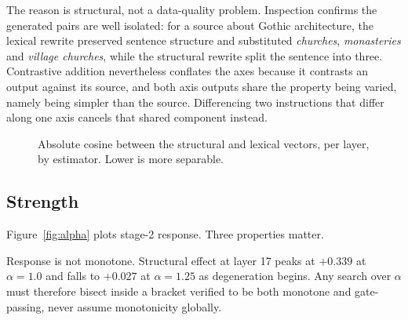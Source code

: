 \documentclass[twocolumn,10pt,a4paper]{article}
\begin{document}
The reason is structural, not a data-quality problem. Inspection confirms the
generated pairs are well isolated: for a source about Gothic architecture, the
lexical rewrite preserved sentence structure and substituted
\emph{churches}, \emph{monasteries} and \emph{village churches}, while the
structural rewrite split the sentence into three. Contrastive addition
nevertheless conflates the axes because it contrasts an output against its
source, and both axis outputs share the property being varied, namely being
simpler than the source. Differencing two instructions that differ along one axis
cancels that shared component instead.

\begin{figure}[t]
\centering
{}
\caption{Absolute cosine between the structural and lexical vectors, per layer,
by estimator. Lower is more separable.}
\label{fig:cos}
\end{figure}

\subsection{Strength}

Figure~\ref{fig:alpha} plots stage-2 response. Three properties matter.

Response is not monotone. Structural effect at layer 17 peaks at $+0.339$ at
$\alpha = 1.0$ and falls to $+0.027$ at $\alpha = 1.25$ as degeneration begins.
Any search over $\alpha$ must therefore bisect inside a bracket verified to be
both monotone and gate-passing, never assume monotonicity globally.
\end{document}
